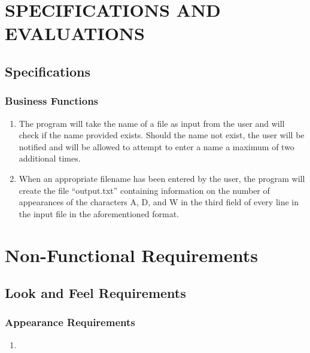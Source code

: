 \documentclass[]{article}
\begin{document}

\section{SPECIFICATIONS AND EVALUATIONS}
\label{sec:functional_requirements}

\subsection{Specifications}
\label{sub:user_characteristics}

\subsubsection{Business Functions}
\label{sub:user_characteristics}
\begin{enumerate}
  \item The program will take the name of a file as input from the user and will
  check if the name provided exists.  Should the name not exist, the user will
  be notified and will be allowed to attempt to enter a name a maximum of two
  additional times.
  \item When an appropriate filename has been entered by the user, the program
  will create the file ``output.txt'' containing information on the number of
  appearances of the characters A, D, and W in the third field of every line in
  the input file in the aforementioned format.
\end{enumerate}



\section{Non-Functional Requirements}
\label{sec:non-functional_requirements}
\subsection{Look and Feel Requirements}
\label{sub:look_and_feel_requirements}

\subsubsection{Appearance Requirements}
\label{ssub:appearance_requirements}
\begin{enumerate}[{LF}1. ]
	\item 
\end{enumerate}
\end{document}

